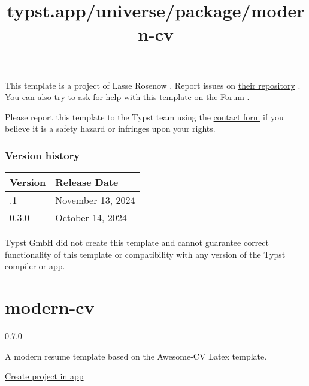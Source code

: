 This template is a project of Lasse Rosenow . Report issues on
\href{https://github.com/LasseRosenow/HAW-Hamburg-Typst-Template}{their
repository} . You can also try to ask for help with this template on the
\href{https://forum.typst.app}{Forum} .

Please report this template to the Typst team using the
\href{https://typst.app/contact}{contact form} if you believe it is a
safety hazard or infringes upon your rights.

\label{versions}
\subsubsection{Version history}\label{version-history}

\begin{longtable}[]{@{}ll@{}}
\toprule\noalign{}
Version & Release Date \\
\midrule\noalign{}
\endhead
\bottomrule\noalign{}
\endlastfoot
0.3.1 & November 13, 2024 \\
\href{https://typst.app/universe/package/haw-hamburg-report/0.3.0/}{0.3.0}
& October 14, 2024 \\
\end{longtable}

Typst GmbH did not create this template and cannot guarantee correct
functionality of this template or compatibility with any version of the
Typst compiler or app.


\title{typst.app/universe/package/modern-cv}

\label{banner}
\label{template-thumbnail}

\section{modern-cv}\label{modern-cv}

{ 0.7.0 }

A modern resume template based on the Awesome-CV Latex template.

\href{/app?template=modern-cv&version=0.7.0}{Create project in app}

\label{readme}
\href{https://github.com/DeveloperPaul123/modern-cv/stargazers}{\pandocbounded{}}
\href{https://discord.gg/CX2ybByRnt}{\pandocbounded{\texttt{[image: https://img.shields.io/discord/652515194572111872?logo=Discord]}}}
\href{https://github.com/DeveloperPaul123/modern-cv/actions/workflows/tests.yml}{\pandocbounded{}}

